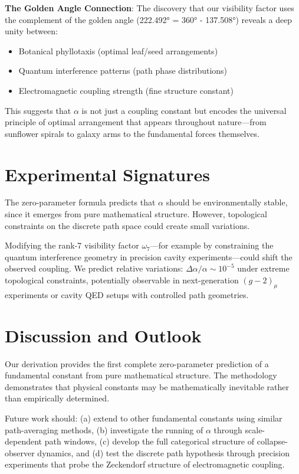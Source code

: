 \documentclass[%
 reprint,
 amsmath,amssymb,
 aps,
 prd,
 10pt,
 nofootinbib,      %
 longbibliography  %
]{revtex4-2}
\theoremstyle{definition}
\theoremstyle{remark}
\begin{document}
\textbf{The Golden Angle Connection}: The discovery that our visibility factor uses the complement of the golden angle (222.492° = 360° - 137.508°) reveals a deep unity between:
\begin{itemize}
\item Botanical phyllotaxis (optimal leaf/seed arrangements)
\item Quantum interference patterns (path phase distributions)
\item Electromagnetic coupling strength (fine structure constant)
\end{itemize}

This suggests that $\alpha$ is not just a coupling constant but encodes the universal principle of optimal arrangement that appears throughout nature—from sunflower spirals to galaxy arms to the fundamental forces themselves.

\section{Experimental Signatures}\label{sec:exp}

The zero-parameter formula predicts that $\alpha$ should be environmentally stable,
since it emerges from pure mathematical structure. However, topological constraints
on the discrete path space could create small variations.

Modifying the rank-7 visibility factor $\omega_7$---for example by constraining
the quantum interference geometry in precision cavity experiments---could shift
the observed coupling. We predict relative variations:
\(\Delta\alpha/\alpha \sim 10^{-5}\)
under extreme topological constraints, potentially observable in next-generation
$(g-2)_\mu$ experiments or cavity QED setups with controlled path geometries.

\section{Discussion and Outlook}\label{sec:discussion}

Our derivation provides the first complete zero-parameter prediction
of a fundamental constant from pure mathematical structure.
The methodology demonstrates that physical constants may be
mathematically inevitable rather than empirically determined.

Future work should:
(a) extend to other fundamental constants using similar path-averaging methods,
(b) investigate the running of $\alpha$ through scale-dependent path windows,
(c) develop the full categorical structure of collapse-observer dynamics,
and (d) test the discrete path hypothesis through precision experiments
that probe the Zeckendorf structure of electromagnetic coupling.
\end{document}
